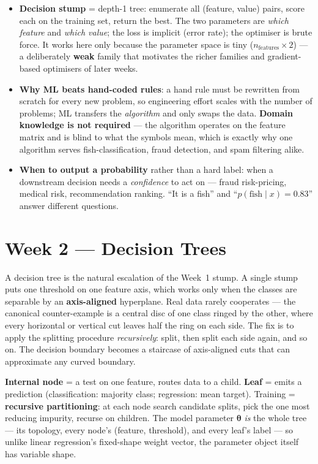 \documentclass[11pt, a4paper]{article}
\newcommand{\kw}[1]{\textbf{#1}}
\begin{document}
\begin{itemize}
  \item \kw{Decision stump} = depth-1 tree: enumerate all (feature, value) pairs, score each on the
  training set, return the best. The two parameters are \emph{which feature} and \emph{which value};
  the loss is implicit (error rate); the optimiser is brute force. It works here only because the
  parameter space is tiny ($n_{\text{features}}\times2$) — a deliberately \kw{weak} family that
  motivates the richer families and gradient-based optimisers of later weeks.
  \item \kw{Why ML beats hand-coded rules}: a hand rule must be rewritten from scratch for every new
  problem, so engineering effort scales with the number of problems; ML transfers the \emph{algorithm}
  and only swaps the data. \kw{Domain knowledge is not required} — the algorithm operates on the
  feature matrix and is blind to what the symbols mean, which is exactly why one algorithm serves
  fish-classification, fraud detection, and spam filtering alike.
  \item \kw{When to output a probability} rather than a hard label: when a downstream decision needs a
  \emph{confidence} to act on — fraud risk-pricing, medical risk, recommendation ranking. ``It is a
  fish'' and ``$p(\text{fish}\mid x)=0.83$'' answer different questions.
\end{itemize}

\section{Week 2 — Decision Trees}

A decision tree is the natural escalation of the Week~1 stump. A single stump puts one threshold on
one feature axis, which works only when the classes are separable by an \kw{axis-aligned} hyperplane.
Real data rarely cooperates — the canonical counter-example is a central disc of one class ringed by
the other, where every horizontal or vertical cut leaves half the ring on each side. The fix is to
apply the splitting procedure \emph{recursively}: split, then split each side again, and so on. The
decision boundary becomes a staircase of axis-aligned cuts that can approximate any curved boundary.

\begin{setupbox}
\kw{Internal node} = a test on one feature, routes data to a child. \kw{Leaf} = emits a prediction
(classification: majority class; regression: mean target). Training = \kw{recursive partitioning}:
at each node search candidate splits, pick the one most reducing impurity, recurse on children. The
model parameter $\boldsymbol\theta$ \emph{is} the whole tree — its topology, every node's
(feature, threshold), and every leaf's label — so unlike linear regression's fixed-shape weight
vector, the parameter object itself has variable shape.
\end{setupbox}
\end{document}
